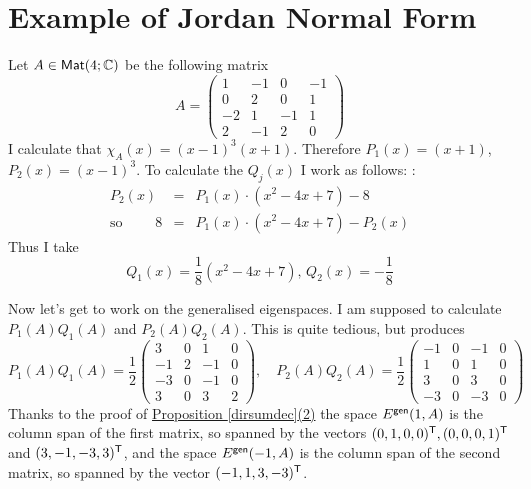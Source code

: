 \documentclass[11pt]{amsbook}
\theoremstyle{definition}
\begin{document}
\section{Example of Jordan Normal Form}

Let $A\in {\sf Mat}(4; \mathbb{C})$ be the following matrix $$A = \begin{pmatrix} 1 & -1 & 0 & -1 \\ 0 & 2 & 0 & 1 \\ -2 & 1 & -1 & 1 \\ 2 & -1 & 2 &0 \end{pmatrix}$$ I calculate that $\chi_A(x) = (x-1)^3 (x+1)$. Therefore $P_1(x)  = (x+1)$, $P_2(x) = (x-1)^3$. To calculate the $Q_j(x)$ I work as follows: :
\begin{eqnarray*} P_2(x) &=& P_1(x) \cdot (x^2-4x+7)-8 \\ \text{so }\qquad 8 &=& P_1(x)\cdot (x^2-4x+7) - P_2(x) \end{eqnarray*} Thus I take $$Q_1(x) = \frac{1}{8}(x^2-4x+7), \, Q_2(x) = -\frac{1}{8}$$

Now let's get to work on the generalised eigenspaces. I am supposed to calculate $P_1(A)Q_1(A)$ and $P_2(A)Q_2(A)$. This is quite tedious, but produces $$P_1(A)Q_1(A) =  \frac{1}{2} \begin{pmatrix} 3 & 0 & 1 & 0 \\ -1 & 2 & -1 & 0 \\  -3 & 0 & -1 & 0 \\ 3 & 0 & 3 & 2 \end{pmatrix}, \quad P_2(A)Q_2(A) = \frac{1}{2}\begin{pmatrix} -1 & 0 & -1 & 0 \\ 1 & 0 & 1 & 0 \\ 3 & 0 & 3 & 0 \\ -3 & 0 & -3 & 0 \end{pmatrix}$$ Thanks to the proof of \hyperref[dirsumdec]{Proposition \ref{dirsumdec}(2)} the space $E^{\sf gen}(1,A)$ is the column span of the first matrix, so spanned by the vectors $(0,1,0,0)^{\sf T}, (0,0,0,1)^{\sf T}$ and $(3,-1,-3,3)^{\sf T}$, and the space $E^{\sf gen}(-1,A)$ is the column span of the second matrix, so spanned by the vector $(-1,1,3,-3)^{\sf T}$.
\end{document}

